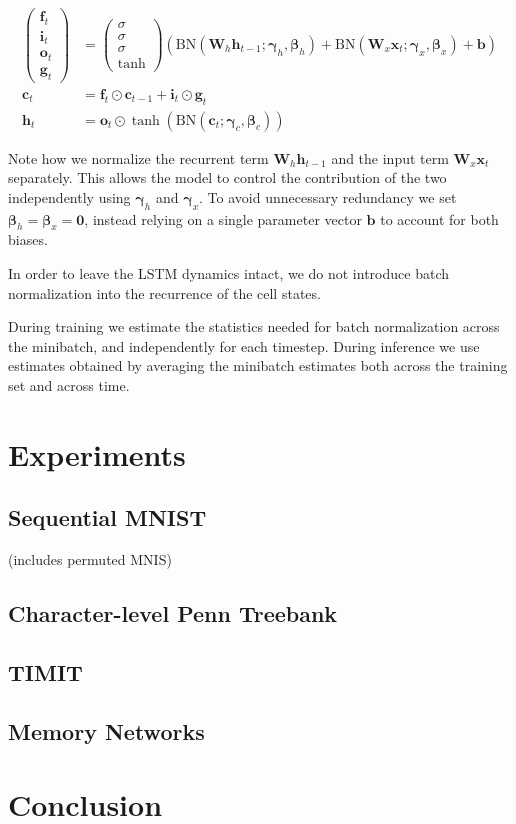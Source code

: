 \documentclass{article} %
\newcommand{\vect}[1]{\mathbf{#1}}
\newcommand{\mat}[1]{\mathbf{#1}}
\newcommand{\ewprod}{\odot}
\begin{document}
\begin{align}
\left(\begin{array}{ccc}
\vect{f}_t \\
\vect{i}_t \\
\vect{o}_t \\
\vect{g}_t
\end{array}\right)
 &=
\left(\begin{array}{ccc}
\sigma \\
\sigma \\
\sigma \\
\tanh
\end{array}\right)
\left(
 \mathrm{BN} (\mat{W}_h \vect{h}_{t-1}; \vect{\gamma}_h, \vect{\beta}_h) +
 \mathrm{BN} (\mat{W}_x \vect{x}_t    ; \vect{\gamma}_x, \vect{\beta}_x) +
 \vect{b}
\right) \\
\vect{c}_t &= \vect{f}_t \ewprod \vect{c}_{t-1} +
              \vect{i}_t \ewprod \vect{g}_t \\
\vect{h}_t &= \vect{o}_t \ewprod \tanh(
 \mathrm{BN} (\vect{c}_t; \vect{\gamma}_c, \vect{\beta}_c)
)
\end{align}

Note how we normalize the recurrent term $\mat{W}_h \vect{h}_{t-1}$ and the input term $\mat{W}_x \vect{x}_t$ separately.
This allows the model to control the contribution of the two independently using $\vect{\gamma}_h$ and $\vect{\gamma}_x$.
To avoid unnecessary redundancy we set $\vect{\beta}_h = \vect{\beta}_x = \vect{0}$, instead relying on a single parameter vector $\vect{b}$ to account for both biases.

In order to leave the LSTM dynamics intact, we do not introduce batch normalization into the recurrence of the cell states.

During training we estimate the statistics needed for batch normalization across the minibatch, and independently for each timestep.
During inference we use estimates obtained by averaging the minibatch estimates both across the training set and across time.

\section{Experiments}

\subsection{Sequential MNIST}
(includes permuted MNIS)

\subsection{Character-level Penn Treebank}

\subsection{TIMIT}

\subsection{Memory Networks}

\section{Conclusion}
\end{document}

